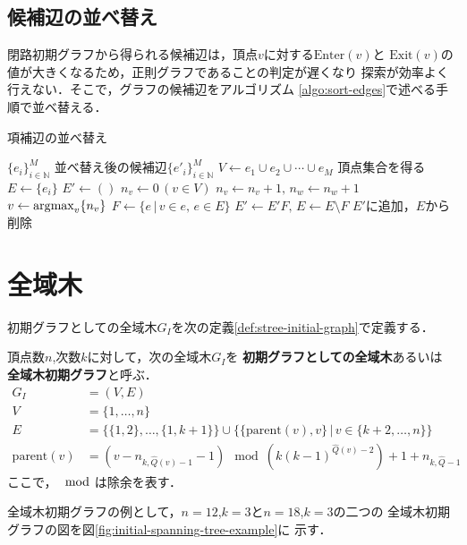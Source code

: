 \subsection*{候補辺の並べ替え}
閉路初期グラフから得られる候補辺は，頂点$v$に対する$\text{Enter}(v)$と
$\text{Exit}(v)$の値が大きくなるため，正則グラフであることの判定が遅くなり
探索が効率よく行えない．そこで，グラフの候補辺をアルゴリズム
\ref{algo:sort-edges}で述べる手順で並べ替える．
\begin{algorithm}[H]
  \caption{項補辺の並べ替え}
  \label{algo:sort-edges}
  \begin{algorithmic}[1]
    \Require $\{e_i\}_{i\in\mathbb{N}}^M$
    \Ensure 並べ替え後の候補辺$\{e'_i\}_{i\in\mathbb{N}}^M$
    \State $V\gets e_1\cup e_2\cup\cdots\cup e_M$
    \Comment 頂点集合を得る
    \State $E\gets\{e_i\}$
    \State $E'\gets()$
    \State $n_v\gets0\,(v\in V)$
    \State $n_v\gets n_v+1,\,n_w\gets n_w+1$
    \EndFor
    \State $v\gets \operatorname*{\arg\!\max}_v\{n_v\}$
    \State $F\gets \{e\,|\,v\in e,\,e\in E\}$
    \State $E'\gets E'F,\,E\gets E\setminus F$
    \Comment $E'$に追加，$E$から削除
    \EndWhile
    \EndProcedure
  \end{algorithmic}
\end{algorithm}

\section{全域木}
\label{sect:initial-spanning-tree}
初期グラフとしての全域木$G_I$を次の定義\ref{def:stree-initial-graph}で定義する．
\begin{definition}[初期グラフとしての全域木]
  \label{def:stree-initial-graph}
  頂点数$n$,次数$k$に対して，次の全域木$G_I$を
  \textbf{初期グラフとしての全域木}あるいは
  \textbf{全域木初期グラフ}と呼ぶ．
  \begin{equation}
    \begin{aligned}
      G_I&=(V,E) \\
      V&=\{1,\ldots,n\} \\
      E&=\{\{1,2\},\ldots,\{1,k+1\}\}\cup
      \{\{\text{parent}(v),v\}\,|\,v\in \{k+2,\ldots,n\}\}  \\
      \text{parent}(v)&=
      (v-n_{k,\hat{Q}(v)-1}-1)\mod(k(k-1)^{\hat{Q}(v)-2})+1+n_{k,\hat{Q}-1}
    \end{aligned}
  \end{equation}
  ここで，$\mod$は除余を表す．
\end{definition}
全域木初期グラフの例として，$n=12$,$k=3$と$n=18$,$k=3$の二つの
全域木初期グラフの図を図\ref{fig:initial-spanning-tree-example}に
示す．

